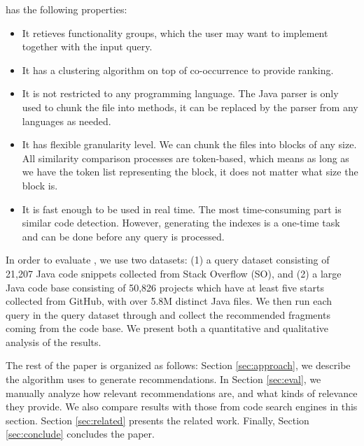 {\tool} has the following properties:
\begin{itemize}
	\item It retieves functionality groups, which the user may want to implement together with the input query.
	\item It has a clustering algorithm on top of co-occurrence to provide ranking.
	\item It is not restricted to any programming language. The Java parser is only used to chunk the file into methods, it can be replaced by the parser from any languages as needed.
	\item It has flexible granularity level. We can chunk the files into blocks of any size. All similarity comparison processes are token-based, which means as long as we have the token list representing the block, it does not matter what size the block is.
	\item It is fast enough to be used in real time. The most
          time-consuming part is similar code detection. However,
          generating the indexes is a one-time task and can be done
          before any query is processed.	
\end{itemize}

In order to evaluate {\tool}, we use two datasets: (1) a query dataset
consisting of 21,207 Java code snippets collected from Stack Overflow
(SO), and (2) a large Java code base consisting of 50,826 projects which 
have at least five starts collected from GitHub, with over 5.8M distinct 
Java files. We then run each query in the query dataset through {\tool} 
and collect the recommended fragments coming from the code base. 
We present both a quantitative and qualitative analysis of the results.

The rest of the paper is organized as follows: Section
\ref{sec:approach}, we describe the algorithm {\tool} uses to generate
recommendations. In Section \ref{sec:eval}, we manually analyze how
relevant {\tool} recommendations are, and what kinds of relevance they
provide. We also compare {\tool} results with those from code search
engines in this section. Section \ref{sec:related} presents the
related work. Finally, Section \ref{sec:conclude} concludes the paper.
